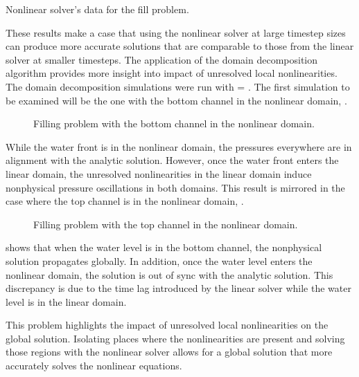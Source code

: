 \begin{table}[h!tb]
\centering
\singlespace

\caption{Nonlinear solver's data for the fill problem.}
\label{tab:vmpNlnRunTime}
\end{table}

These results make a case that using the nonlinear solver at large timestep sizes can produce more accurate solutions that are comparable to those from the linear solver at smaller timesteps.
The application of the domain decomposition algorithm provides more insight into impact of unresolved local nonlinearities.
The domain decomposition simulations were run with \dtmax{} = .
The first simulation to be examined will be the one with the bottom channel in the nonlinear domain, .

\begin{figure}[h!tb]
\centering

\caption{Filling problem with the bottom channel in the nonlinear domain.}
\label{fig:vmpDDBotChan}
\end{figure}

While the water front is in the nonlinear domain, the pressures everywhere are in alignment with the analytic solution.
However, once the water front enters the linear domain, the unresolved nonlinearities in the linear domain induce nonphysical pressure oscillations in both domains.
This result is mirrored in the case where the top channel is in the nonlinear domain, .

\begin{figure}[h!tb]
\centering

\caption{Filling problem with the top channel in the nonlinear domain.}
\label{fig:vmpDDTopChan}
\end{figure}

 shows that when the water level is in the bottom channel, the nonphysical solution propagates globally.
In addition, once the water level enters the nonlinear domain, the solution is out of sync with the analytic solution.
This discrepancy is due to the time lag introduced by the linear solver while the water level is in the linear domain.

This problem highlights the impact of unresolved local nonlinearities on the global solution.
Isolating places where the nonlinearities are present and solving those regions with the nonlinear solver allows for a global solution that more accurately solves the nonlinear equations.

